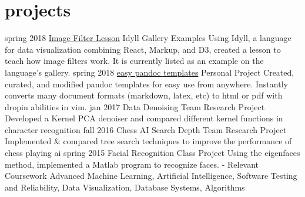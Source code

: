 \documentclass[]{friggeri-cv}
\begin{document}
\section{projects}

\begin{entrylist}
  \entry
    {spring 2018}
    {\href{https://idyll-lang.org/gallery/stepping-into-the-filter}{Image Filter Lesson}}
    {Idyll Gallery Examples}
    {Using Idyll, a language for data visualization combining React, Markup, and D3, created a lesson to teach how image filters work. It is currently listed as an example on the language's gallery.}
  \entry
    {spring 2018}
    {\href{https://github.com/ryangrose/easy-pandoc-templates}{easy pandoc templates}}
    {Personal Project}
    {Created, curated, and modified pandoc templates for easy use from anywhere. Instantly converts many document formats (markdown, latex, etc) to html or pdf with dropin abilities in vim.}
   \entry
    {jan 2017}
    {Data Denoising}
    {Team Research Project}
    {Developed a Kernel PCA denoiser and compared different kernel functions in character recognition}
  \entry
    {fall 2016}
    {Chess AI Search Depth}
    {Team Research Project}
    {Implemented \& compared tree search techniques to improve the performance of chess playing ai}
  \entry
    {spring 2015}
    {Facial Recognition}
    {Class Project}
    {Using the eigenfaces method, implemented a Matlab program to recognize faces.}
  \entry
    {-}
    {Relevant Coursework}
    {}
    {Advanced Machine Learning, Artificial Intelligence, Software Testing and Reliability, Data Visualization, Database Systems, Algorithms}
\end{entrylist}




\end{document}
